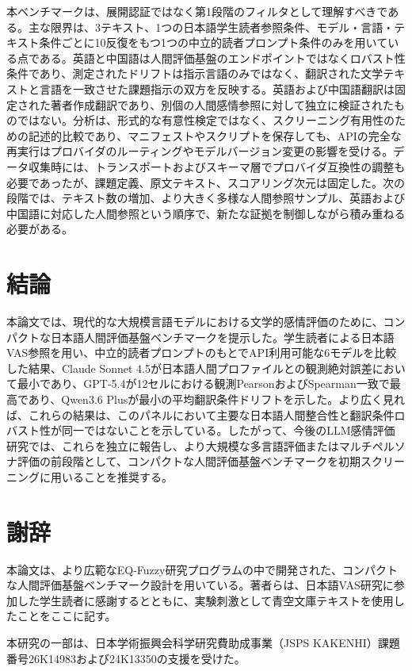 \documentclass[lualatex,ja=standard,a4paper,11pt]{bxjsarticle}
\begin{document}
本ベンチマークは、展開認証ではなく第1段階のフィルタとして理解すべきである。主な限界は、3テキスト、1つの日本語学生読者参照条件、モデル・言語・テキスト条件ごとに10反復をもつ1つの中立的読者プロンプト条件のみを用いている点である。英語と中国語は人間評価基盤のエンドポイントではなくロバスト性条件であり、測定されたドリフトは指示言語のみではなく、翻訳された文学テキストと言語を一致させた課題指示の双方を反映する。英語および中国語翻訳は固定された著者作成翻訳であり、別個の人間感情参照に対して独立に検証されたものではない。分析は、形式的な有意性検定ではなく、スクリーニング有用性のための記述的比較であり、マニフェストやスクリプトを保存しても、APIの完全な再実行はプロバイダのルーティングやモデルバージョン変更の影響を受ける。データ収集時には、トランスポートおよびスキーマ層でプロバイダ互換性の調整も必要であったが、課題定義、原文テキスト、スコアリング次元は固定した。次の段階では、テキスト数の増加、より大きく多様な人間参照サンプル、英語および中国語に対応した人間参照という順序で、新たな証拠を制御しながら積み重ねる必要がある。

\section{結論}

本論文では、現代的な大規模言語モデルにおける文学的感情評価のために、コンパクトな日本語人間評価基盤ベンチマークを提示した。学生読者による日本語VAS参照を用い、中立的読者プロンプトのもとでAPI利用可能な6モデルを比較した結果、Claude Sonnet 4.5が日本語人間プロファイルとの観測絶対誤差において最小であり、GPT-5.4が12セルにおける観測PearsonおよびSpearman一致で最高であり、Qwen3.6 Plusが最小の平均翻訳条件ドリフトを示した。より広く見れば、これらの結果は、このパネルにおいて主要な日本語人間整合性と翻訳条件ロバスト性が同一ではないことを示している。したがって、今後のLLM感情評価研究では、これらを独立に報告し、より大規模な多言語評価またはマルチペルソナ評価の前段階として、コンパクトな人間評価基盤ベンチマークを初期スクリーニングに用いることを推奨する。

\section*{謝辞}

本論文は、より広範なEQ-Fuzzy研究プログラムの中で開発された、コンパクトな人間評価基盤ベンチマーク設計を用いている。著者らは、日本語VAS研究に参加した学生読者に感謝するとともに、実験刺激として青空文庫テキストを使用したことをここに記す。

本研究の一部は、日本学術振興会科学研究費助成事業（JSPS KAKENHI）課題番号26K14983および24K13350の支援を受けた。
\end{document}
